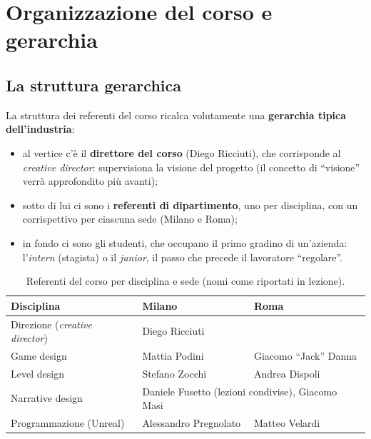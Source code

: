 \section{Organizzazione del corso e gerarchia}
\label{sec:gerarchia-corso}

\subsection{La struttura gerarchica}



La struttura dei referenti del corso ricalca volutamente una
\textbf{gerarchia tipica dell'industria}:
\begin{itemize}
  \item al vertice c'è il \textbf{direttore del corso} (Diego Ricciuti), che
        corrisponde al \emph{creative director}: supervisiona la visione del
        progetto (il concetto di ``visione'' verrà approfondito più avanti);
  \item sotto di lui ci sono i \textbf{referenti di dipartimento}, uno per
        disciplina, con un corrispettivo per ciascuna sede (Milano e Roma);
  \item in fondo ci sono gli studenti, che occupano il primo gradino di
        un'azienda: l'\emph{intern} (stagista) o il \emph{junior}, il passo
        che precede il lavoratore ``regolare''.
\end{itemize}

\begin{table}[htbp]
  \centering
  \begin{tabular}{@{}p{}p{}p{}@{}}
    \toprule
    \textbf{Disciplina} & \textbf{Milano} & \textbf{Roma} \\
    \midrule
    Direzione (\emph{creative director}) & \multicolumn{2}{p{0.58\textwidth}}{Diego Ricciuti} \\
    Game design      & Mattia Podini        & Giacomo ``Jack'' Danna \\
    Level design     & Stefano Zocchi       & Andrea Dispoli \\
    Narrative design & \multicolumn{2}{p{0.58\textwidth}}{Daniele Fusetto (lezioni condivise), Giacomo Masi} \\
    Programmazione (Unreal) & Alessandro Pregnolato & Matteo Velardi \\
    \bottomrule
  \end{tabular}
  \caption{Referenti del corso per disciplina e sede (nomi come riportati in lezione).}
  \label{tab:referenti}
\end{table}

